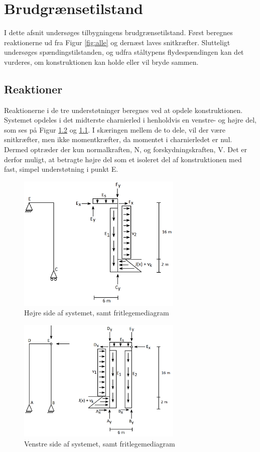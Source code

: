 \chapter{Brudgrænsetilstand}

I dette afsnit undersøges tilbygningens brudgrænsetilstand. Først beregnes reaktionerne ud fra Figur \ref{fig:alle} og dernæst laves snitkræfter. Slutteligt undersøges spændingstilstanden, og udfra ståltypens flydespændingen kan det vurderes, om konstruktionen kan holde eller vil bryde sammen.   

\section{Reaktioner}
Reaktionerne i de tre understøtninger beregnes ved at opdele konstruktionen. Systemet opdeles i det midterste charnierled i henholdvis en venstre- og højre del, som ses på Figur \ref{fig:opdelingv} og \ref{fig:opdelingh}. I skæringen mellem de to dele, vil der være snitkræfter, men ikke momentkræfter, da momentet i charnierledet er nul. Dermed optræder der kun normalkraften, N, og forskydningskraften, V. Det er derfor muligt, at betragte højre del som et isoleret del af konstruktionen med fast, simpel understøtning i punkt E.

\begin{figure}[H]
	\centering
	\includegraphics[width=0.7\textwidth]{billeder/hojre.png}
	\caption{Højre side af systemet, samt fritlegemediagram}
	\label{fig:opdelingh}
\end{figure}

\begin{figure}[H]
	\centering
	\includegraphics[width=0.7\textwidth]{billeder/venstre.png}
	\caption{Venstre side af systemet, samt fritlegemediagram}
	\label{fig:opdelingv}
\end{figure}

